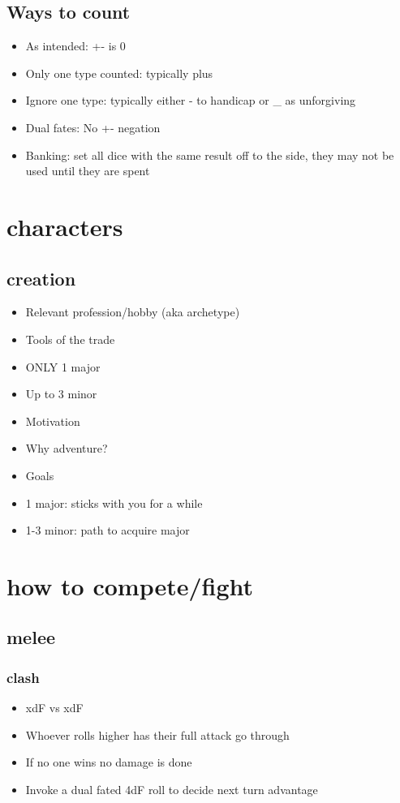 \documentclass[10pt,letterpaper]{article}
\begin{document}
	\subsection{Ways to count}
	\begin{itemize}
		\item  As intended: +- is 0
		\item  Only one type counted: typically plus
		\item  Ignore one type: typically either - to handicap or \_ as unforgiving
		\item  Dual fates: No +- negation
		\item  Banking: set all dice with the same result off to the side, they may not be used until they are spent
	\end{itemize}
	\section{characters}
	\subsection{creation}
	\begin{itemize}
		\item  Relevant profession/hobby (aka archetype)
		\item  Tools of the trade
		\item  ONLY 1 major
		\item  Up to 3 minor
		\item  Motivation
		\item  Why adventure?
		\item  Goals
		\item  1 major: sticks with you for a while
		\item  1-3 minor: path to acquire major
	\end{itemize}
	\section{how to compete/fight}
	\subsection{melee}
	\subsubsection{clash}
	\begin{itemize}
		\item  xdF vs xdF
		\item  Whoever rolls higher has their full attack go through
		\item  If no one wins no damage is done
		\item  Invoke a dual fated 4dF roll to decide next turn advantage
	\end{itemize}
\end{document}
